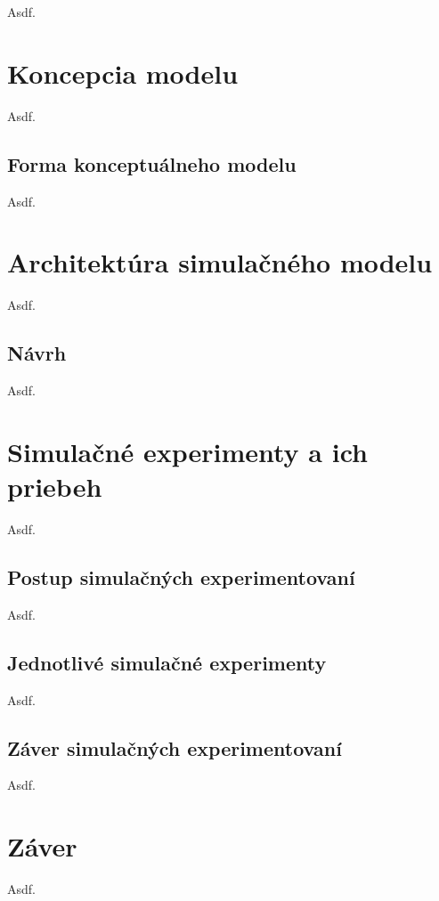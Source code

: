 \documentclass[11pt,a4paper]{article}
\begin{document}
        Asdf.

\section{Koncepcia modelu}

    Asdf.

    \subsection{Forma konceptuálneho modelu}

        Asdf.


\section{Architektúra simulačného modelu}

    Asdf.

    \subsection{Návrh}

        Asdf.

\section{Simulačné experimenty a ich priebeh}

    Asdf.

    \subsection{Postup simulačných experimentovaní}

        Asdf.

    \subsection{Jednotlivé simulačné experimenty}

        Asdf.

    \subsection{Záver simulačných experimentovaní}

        Asdf.

\section{Záver}

    Asdf.\cite{IMS}



\newpage %

\makeatletter
\makeatother

\begin{flushleft}
    
\end{flushleft}
\end{document}
